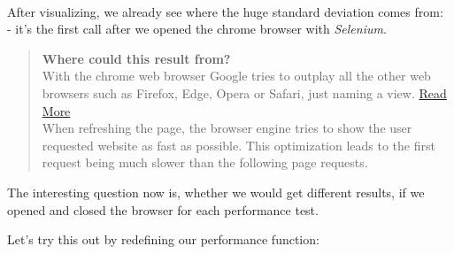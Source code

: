 \documentclass[11pt]{article}
\begin{document}
    
    \begin{center}
    \end{center}
    { \hspace*{\fill} \\}
    
    After visualizing, we already see where the huge standard deviation
comes from:\\
- it's the first call after we opened the chrome browser with
\emph{Selenium}.

\begin{quote}
\textbf{Where could this result from?}\\
With the chrome web browser Google tries to outplay all the other web
browsers such as Firefox, Edge, Opera or Safari, just naming a view.
\href{https://computer.howstuffworks.com/google-chrome-browser6.htm}{Read
More}\\
When refreshing the page, the browser engine tries to show the user
requested website as fast as possible. This optimization leads to the
first request being much slower than the following page requests.
\end{quote}

The interesting question now is, whether we would get different results,
if we opened and closed the browser for each performance test.

Let's try this out by redefining our performance function:
\end{document}
